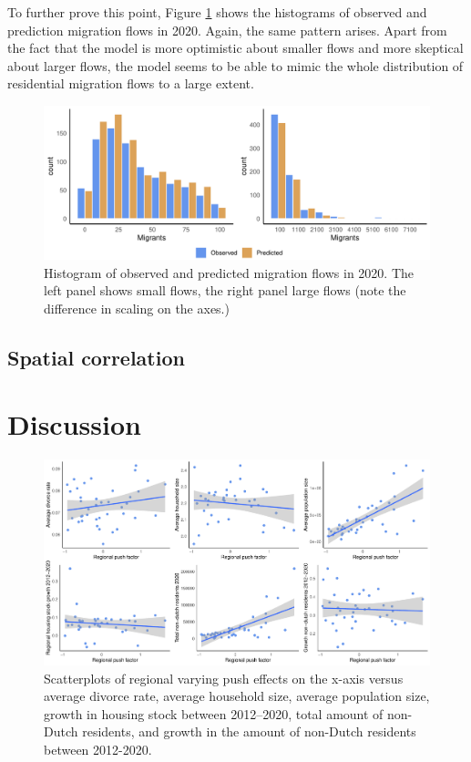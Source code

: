 \documentclass[11pt,parskip,abstracton,notitlepage, dvipsnames]{scrartcl}
\begin{document}
To further prove this point, Figure \ref{fig:hist_pred} shows the histograms of observed and prediction migration flows in 2020. Again, the same pattern arises. Apart from the fact that the model is more optimistic about smaller flows and more skeptical about larger flows, the model seems to be able to mimic the whole distribution of residential migration flows to a large extent. 

\begin{figure}[ht]\centering %
  \includegraphics[width=1.0\linewidth]{./../../fig/hist_fit.pdf}
  \caption{Histogram of observed and predicted migration flows in 2020. The left panel shows small flows, the right panel large flows (note the difference in scaling on the axes.)}
  \label{fig:hist_pred}
\end{figure}

\subsection{Spatial correlation\label{subsec:spatial}}

\section{Discussion\label{sec:discussion}}

\begin{figure}[ht]\centering %
	\includegraphics[width=1.0\linewidth]{./../../fig/regional_out_plot.pdf}
	\caption{Scatterplots of regional varying push effects on the x-axis versus average divorce rate, average household size, average population size, growth in housing stock between 2012--2020, total amount of non-Dutch residents, and growth in the amount of non-Dutch residents between 2012-2020.}
	\label{fig:scatter_out}
\end{figure}
\end{document}
